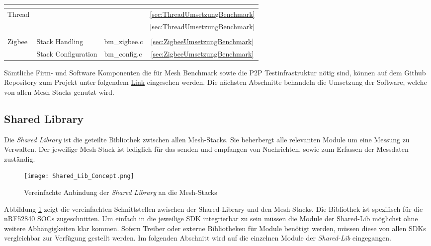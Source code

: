 \begin{table}
\begin{tabular}{|l|l|l|c|}
\hline
\multicolumn{1}{l}{} & \multicolumn{1}{l}{} & \multicolumn{1}{l}{} & \multicolumn{1}{l}{} \\ 
\hline
\multirow{2}{*}{Thread} &  &  & \ref{sec:ThreadUmsetzungBenchmark} \\ 
\cline{2-4}
 &  &  & \ref{sec:ThreadUmsetzungBenchmark} \\ 
\hline
\multicolumn{1}{l}{} & \multicolumn{1}{l}{} & \multicolumn{1}{l}{} & \multicolumn{1}{l}{} \\ 
\hline
\multirow{2}{*}{Zigbee} & Stack Handling & bm\_zigbee.c & \ref{sec:ZigbeeUmsetzungBenchmark} \\ 
\cline{2-4}
 & Stack Configuration & bm\_config.c & \ref{sec:ZigbeeUmsetzungBenchmark} \\
\hline
\end{tabular}
\end{table}


Sämtliche Firm- und Software Komponenten die für Mesh Benchmark sowie die P2P Testinfrastruktur nötig sind, können auf dem Github Repository zum Projekt unter folgendem \href{https://github.com/Rouben94/P6_Software}{Link\footnotemark[\value{footnote}]}  eingesehen werden. Die nächsten Abschnitte behandeln die Umsetzung der Software, welche von allen Mesh-Stacks genutzt wird.





\subsection{Shared Library}\label{subsec:SharedLibrary}

Die \textit{Shared Library} ist die geteilte Bibliothek zwischen allen Mesh-Stacks. Sie beherbergt alle relevanten Module um eine Messung zu Verwalten. Der jeweilige Mesh-Stack ist lediglich für das senden und empfangen von Nachrichten, sowie zum Erfassen der Messdaten zuständig. 


\begin{figure}[H]
	\centering
	\texttt{[image: Shared\_Lib\_Concept.png]}
	\caption{Vereinfachte Anbindung der \textit{Shared Library} an die Mesh-Stacks}\label{fig:ShardeLibConcept}
\end{figure}

Abbildung \ref{fig:ShardeLibConcept} zeigt die vereinfachten Schnittstellen zwischen der Shared-Library und den Mesh-Stacks. Die Bibliothek ist spezifisch für die nRF52840 SOCs zugeschnitten. Um einfach in die jeweilige SDK integrierbar zu sein müssen die Module der Shared-Lib möglichst ohne weitere Abhängigkeiten klar kommen. Sofern Treiber oder externe Bibliotheken für Module benötigt werden, müssen diese von allen SDKs vergleichbar zur Verfügung gestellt werden. Im folgenden Abschnitt wird auf die einzelnen Module der \textit{Shared-Lib} eingegangen. 


